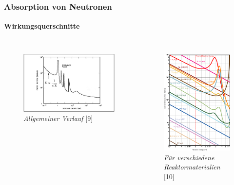 \documentclass{beamer}[9pt]
\begin{document}
\begin{frame}
\frametitle{Absorption von Neutronen}
\framesubtitle{Wirkungsquerschnitte}

\begin{columns}
\begin{figure}
\includegraphics[scale=0.4]{general_crossection.png}\\
\textit{Allgemeiner Verlauf} [9]
\end{figure}


\vspace{-.6cm}
\begin{figure}[htp]
\centering
\includegraphics[scale=.25]{multi_absorption_cs.jpg}\\
\textit{Für verschiedene Reaktormaterialien} [10]
\end{figure}
\end{columns}



\end{frame}
\end{document}
